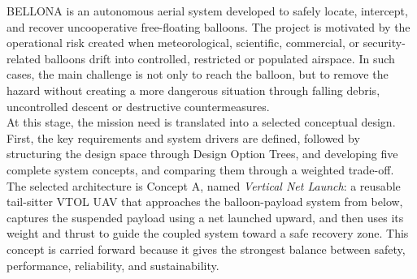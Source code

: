 

BELLONA is an autonomous aerial system developed to safely locate, intercept, and recover uncooperative free-floating balloons. The project is motivated by the operational risk created when meteorological, scientific, commercial, or security-related balloons drift into controlled, restricted or populated airspace. In such cases, the main challenge is not only to reach the balloon, but to remove the hazard without creating a more dangerous situation through falling debris, uncontrolled descent or destructive countermeasures. \\

At this stage, the mission need is translated into a selected conceptual design. First, the key requirements and system drivers are defined, followed by structuring the design space through Design Option Trees, and developing five complete system concepts, and comparing them through a weighted trade-off. The selected architecture is Concept A, named \textit{Vertical Net Launch}: a reusable tail-sitter VTOL UAV that approaches the balloon-payload system from below, captures the suspended payload using a net launched upward, and then uses its weight and thrust to guide the coupled system toward a safe recovery zone. This concept is carried forward because it gives the strongest balance between safety, performance, reliability, and sustainability.





